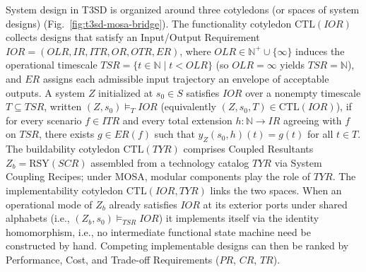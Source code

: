 System design in T3SD is organized around three cotyledons (or spaces of system designs) (Fig.~\ref{fig:t3sd-mosa-bridge}).  The functionality cotyledon $\mathrm{CTL}(IOR)$ collects designs that satisfy an Input/Output Requirement $IOR = (OLR, IR, ITR, OR, OTR, ER)$, where $OLR \in \mathbb{N}^+ \cup \{\infty\}$ induces the operational timescale $TSR = \{t \in \mathbb{N} \mid t < OLR\}$ (so $OLR = \infty$ yields $TSR = \mathbb{N}$), and $ER$ assigns each admissible input trajectory an envelope of acceptable outputs.  A system $Z$ initialized at $s_0 \in S$ satisfies $IOR$ over a nonempty timescale $T \subseteq TSR$, written $(Z, s_0) \models_T IOR$ (equivalently $(Z, s_0, T) \in \mathrm{CTL}(IOR)$), if for every scenario $f \in ITR$ and every total extension $h : \mathbb{N} \to IR$ agreeing with $f$ on $TSR$, there exists $g \in ER(f)$ such that $y_Z(s_0, h)(t) = g(t)$ for all $t \in T$.  The buildability cotyledon $\mathrm{CTL}(TYR)$ comprises Coupled Resultants $Z_b = \mathrm{RSY}(SCR)$ assembled from a technology catalog $TYR$ via System Coupling Recipes; under MOSA, modular components play the role of $TYR$.  The implementability cotyledon $\mathrm{CTL}(IOR, TYR)$ links the two spaces.  When an operational mode of $Z_b$ already satisfies $IOR$ at its exterior ports under shared alphabets (i.e., $(Z_b, s_0) \models_{TSR} IOR$) it implements itself via the identity homomorphism, i.e., no intermediate functional state machine need be constructed by hand.  Competing implementable designs can then be ranked by Performance, Cost, and Trade-off Requirements ($PR$, $CR$, $TR$).

